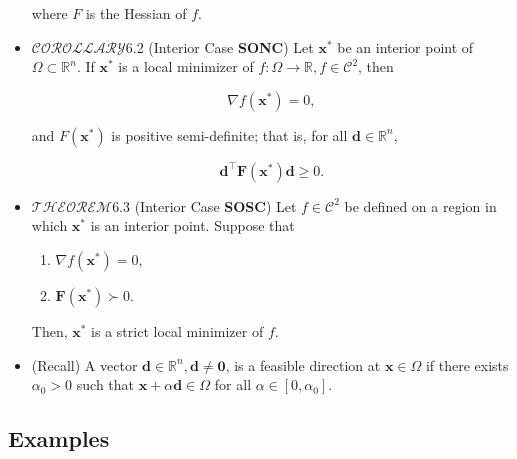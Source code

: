\begin{itemize}
	where \(F\) is the Hessian of \(f\).

	\item  \(\mathscr{COROLLARY}\)6.2 (Interior Case \textbf{SONC}) Let \(\boldsymbol{x}^{*}\) be an interior point of \(\Omega \subset \mathbb{R}^{n}\). If \(\boldsymbol{x}^{*}\) is a local minimizer of \(f: \Omega \rightarrow \mathbb{R}, f \in \mathcal{C}^{2}\), then
	
	\begin{equation*}
		\nabla f\left(\boldsymbol{x}^{*}\right)=0,
	\end{equation*}
	
	and \(F\left(\boldsymbol{x}^{*}\right)\) is positive semi-definite; that is, for all \(\boldsymbol{d} \in \mathbb{R}^{n}\),
	
	\begin{equation*}
		\boldsymbol{d}^{\top} \boldsymbol{F} \left(\boldsymbol{x}^{*}\right) \boldsymbol{d} \geq 0 .
	\end{equation*}

	\item \(\mathscr{THEOREM}\)6.3 (Interior Case \textbf{SOSC}) Let \(f \in \mathcal{C}^{2}\) be defined on a region in which \(\boldsymbol{x}^{*}\) is an interior point. Suppose that
	
	\begin{enumerate}
		\item \(\nabla f\left(\boldsymbol{x}^{*}\right)=0\),
		
		\item \(\boldsymbol{F} \left(\boldsymbol{x}^{*}\right) \succ 0\).
		
	\end{enumerate}
	
	Then, \(\boldsymbol{x}^{*}\) is a strict local minimizer of \(f\).
	
	\item (Recall) A vector \(\boldsymbol{d} \in \mathbb{R}^{n}, \boldsymbol{d} \neq \boldsymbol{0}\), is a feasible direction at \(\boldsymbol{x} \in \Omega\) if there exists \(\alpha_{0}>0\) such that \(\boldsymbol{x}+\alpha \boldsymbol{d}  \in \Omega\) for all \(\alpha \in\left[0, \alpha_{0}\right]\).

\end{itemize}

\subsection{Examples}

